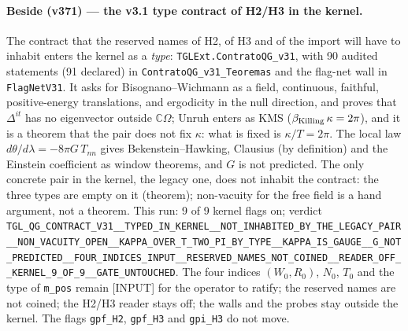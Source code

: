 \documentclass[11pt]{article}
\theoremstyle{definition}\newtheorem{deriv}{Derivation}
\begin{document}
\paragraph*{Beside (v371) --- the v3.1 type contract of H2/H3 in the kernel.} The contract that the reserved names of H2, of H3 and of the import will have to inhabit enters the kernel as a \emph{type}: \texttt{TGLExt.ContratoQG\_v31}, with 90 audited statements (91 declared) in \texttt{ContratoQG\_v31\_Teoremas} and the flag-net wall in \texttt{FlagNetV31}. It asks for Bisognano--Wichmann as a field, continuous, faithful, positive-energy translations, and ergodicity in the null direction, and proves that $\Delta^{it}$ has no eigenvector outside $\mathbb{C}\Omega$; Unruh enters as KMS ($\beta_{\rm Killing}\,\kappa=2\pi$), and it is a theorem that the pair does not fix $\kappa$: what is fixed is $\kappa/T=2\pi$. The local law $d\theta/d\lambda=-8\pi G\,T_{nn}$ gives Bekenstein--Hawking, Clausius (by definition) and the Einstein coefficient as window theorems, and $G$ is not predicted. The only concrete pair in the kernel, the legacy one, does not inhabit the contract: the three types are empty on it (theorem); non-vacuity for the free field is a hand argument, not a theorem. This run: 9 of 9 kernel flags on; verdict \texttt{TGL\_QG\_CONTRACT\_V31\_\_TYPED\_IN\_KERNEL\_\_NOT\_INHABITED\_BY\_THE\_LEGACY\_PAIR\_\_NON\_VACUITY\_OPEN\_\_KAPPA\_OVER\_T\_TWO\_PI\_BY\_TYPE\_\_KAPPA\_IS\_GAUGE\_\_G\_NOT\_PREDICTED\_\_FOUR\_INDICES\_INPUT\_\_RESERVED\_NAMES\_NOT\_COINED\_\_READER\_OFF\_\_KERNEL\_9\_OF\_9\_\_GATE\_UNTOUCHED}. The four indices $(W_0,R_0)$, $N_0$, $T_0$ and the type of \texttt{m\_pos} remain [INPUT] for the operator to ratify; the reserved names are not coined; the H2/H3 reader stays off; the walls and the probes stay outside the kernel. The flags \texttt{gpf\_H2}, \texttt{gpf\_H3} and \texttt{gpi\_H3} do not move.
\end{document}
